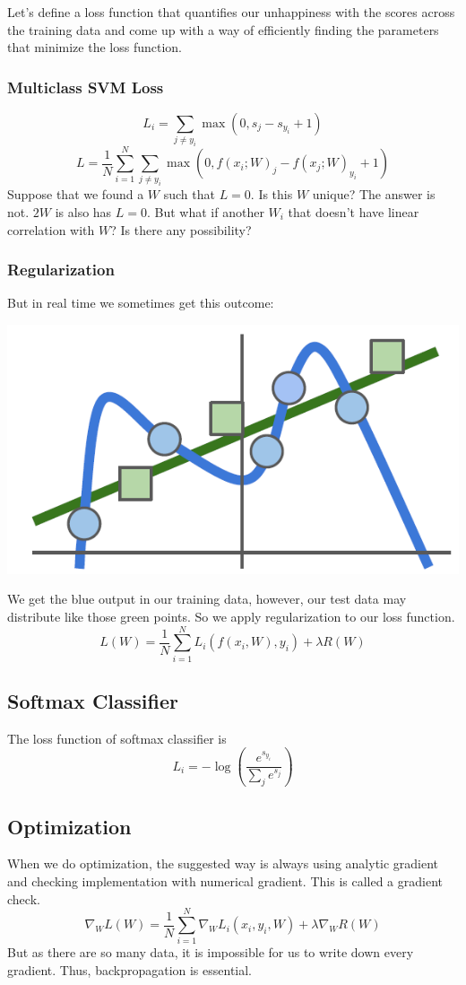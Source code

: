 \documentclass{article}
\begin{document}
Let's define a loss function that quantifies our unhappiness with the scores across the training data and come up with a way of efficiently finding the parameters that minimize the loss function.

\subsubsection{Multiclass SVM Loss}
\[L_i = \sum_{j\neq y_i}\max(0, s_j - s_{y_i} + 1)\]
\[L = \frac{1}{N}\sum_{i=1}^N\sum_{j\neq y_i}\max(0, f(x_i;W)_j-f(x_j;W)_{y_i} + 1)\]
Suppose that we found a $W$ such that $L = 0$. Is this $W$ unique? The answer is not. $2W$ is also has $L = 0$. But what if another $W_i$ that doesn't have linear correlation with $W$? Is there any possibility?

\subsubsection{Regularization}
But in real time we sometimes get this outcome:
\begin{center}
\includegraphics[scale=0.6]{regu.png}
\end{center}
We get the blue output in our training data, however, our test data may distribute like those green points. So we apply regularization to our loss function.
\[L(W) = \frac{1}{N}\sum\limits_{i=1}^N L_i(f(x_i, W), y_i) + \lambda R(W)\]

\subsection{Softmax Classifier}
The loss function of softmax classifier is
\[L_i = -\log(\frac{e^{s_{y_i}}}{\sum_j e^{s_j}})\]

\subsection{Optimization}
When we do optimization, the suggested way is always using analytic gradient and checking implementation with numerical gradient. This is called a gradient check.
\[\nabla_WL(W) = \frac{1}{N}\sum\limits_{i=1}^N\nabla_WL_i(x_i,y_i,W) + \lambda\nabla_WR(W)\]
But as there are so many data, it is impossible for us to write down every gradient. Thus, backpropagation is essential.
\end{document}
